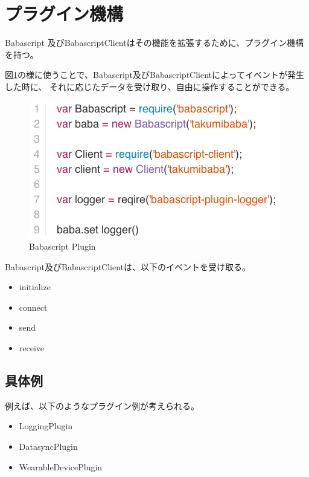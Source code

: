 \section{プラグイン機構}\label{ux30d7ux30e9ux30b0ux30a4ux30f3ux6a5fux69cb}

Babascript
及びBabascriptClientはその機能を拡張するために、プラグイン機構を持つ。

図\ref{fig:babascript_plugin}の様に使うことで、Babascript及びBabascriptClientによってイベントが発生した時に、
それに応じたデータを受け取り、自由に操作することができる。

\begin{figure}[htbp]
  \begin{center}
  \includegraphics[width=.7\linewidth,bb=0 0 416 226]{images/babascript_plugin.js.png}
  \end{center}
  \caption{Babascript Plugin}
  \label{fig:babascript_plugin}
\end{figure}

Babascript及びBabascriptClientは、以下のイベントを受け取る。

\begin{itemize}
\itemsep1pt\parskip0pt
\item
  initialize
\item
  connect
\item
  send
\item
  receive
\end{itemize}

\subsection{具体例}\label{ux5177ux4f53ux4f8b}

例えば、以下のようなプラグイン例が考えられる。

\begin{itemize}
\itemsep1pt\parskip0pt
\item
  LoggingPlugin
\item
  DatasyncPlugin
\item
  WearableDevicePlugin
\end{itemize}

